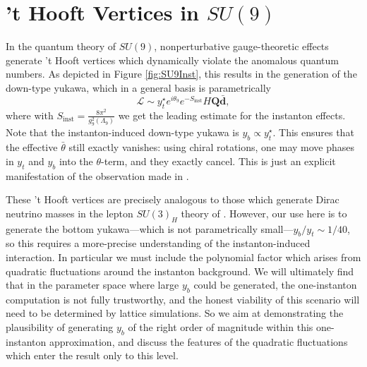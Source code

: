 \documentclass[11pt,a4paper]{article}
\begin{document}
\section{'t Hooft Vertices in \texorpdfstring{$SU(9)$}{SU(9)}} \label{app:SU9thooft}

In the quantum theory of $SU(9)$, nonperturbative gauge-theoretic effects generate 't Hooft vertices which dynamically violate the anomalous quantum numbers. As depicted in Figure \ref{fig:SU9Inst}, this results in the generation of the down-type yukawa, which in a general basis is parametrically
\begin{equation} \label{eqn:ybGenRough}
    \mathcal{L} \sim y_t^\star e^{i \theta_9} e^{-S_\text{inst}} H \mathbf{Q} \mathbf{\bar d},
\end{equation}
where with $S_\text{inst} = \frac{8\pi^2}{g_9^2(\Lambda_9)}$ we get the leading estimate for the instanton effects. Note that the instanton-induced down-type yukawa is $y_b \propto y_t^\star$. This ensures that the effective $\bar{\theta}$ still exactly vanishes: using chiral rotations, one may move phases in $y_t$ and $y_b$ into the $\theta$-term, and they exactly cancel. This is just an explicit manifestation of the observation made in \cite{Choi:1988sy}.

These 't Hooft vertices are precisely analogous to those which generate Dirac neutrino masses in the lepton $SU(3)_H$ theory of \cite{Cordova:2022fhg}. However, our use here is to generate the bottom yukawa---which is not parametrically small---$y_b / y_t \sim 1/40$, so this requires a more-precise understanding of the instanton-induced interaction. In particular we must include the polynomial factor which arises from quadratic fluctuations around the instanton background. 
We will ultimately find that in the parameter space where large $y_b$ could be generated, the one-instanton computation is not fully trustworthy, and the honest viability of this scenario will need to be determined by lattice simulations. So we aim at demonstrating the plausibility of generating $y_b$ of the right order of magnitude within this one-instanton approximation, and discuss the features of the quadratic fluctuations which enter the result only to this level.
\end{document}
